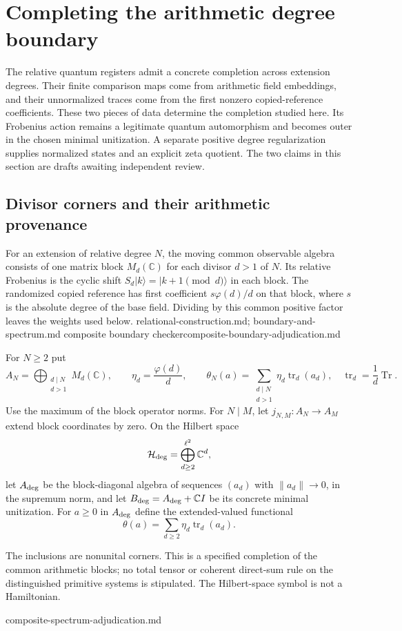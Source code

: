 \section{Completing the arithmetic degree boundary}
\label{sec:composite-degree-completion}

The relative quantum registers admit a concrete completion across extension
degrees. Their finite comparison maps come from arithmetic field embeddings,
and their unnormalized traces come from the first nonzero copied-reference
coefficients. These two pieces of data determine the completion studied
here. Its Frobenius action remains a legitimate quantum automorphism and
becomes outer in the chosen minimal unitization. A separate positive degree
regularization supplies normalized states and an explicit zeta quotient.
The two claims in this section are drafts awaiting independent review.

\subsection{Divisor corners and their arithmetic provenance}

For an extension of relative degree $N$, the moving common observable
algebra consists of one matrix block $M_d(\mathbb C)$ for each divisor
$d>1$ of $N$. Its relative Frobenius is the cyclic shift
$S_d|k\rangle=|k+1\pmod d\rangle$ in each block. The randomized copied
reference has first coefficient $s\varphi(d)/d$ on that block, where
$s$ is the absolute degree of the base field. Dividing by this common
positive factor leaves the weights used below.
{relational-construction.md; boundary-and-spectrum.md}
{composite boundary checker}{composite-boundary-adjudication.md}

\begin{definition}
For $N\geq2$ put
\[
 A_N=\bigoplus_{\substack{d\mid N\\d>1}}M_d(\mathbb C),\qquad
 \eta_d=\frac{\varphi(d)}d,\qquad
 \theta_N(a)=\sum_{\substack{d\mid N\\d>1}}\eta_d\operatorname{tr}_d(a_d),
 \quad \operatorname{tr}_d=\frac1d\operatorname{Tr}.
\]
Use the maximum of the block operator norms. For $N\mid M$, let
$j_{N,M}:A_N\to A_M$ extend block coordinates by zero.
On the Hilbert space
\[
 \mathcal H_{\rm deg}=\bigoplus_{d\geq2}^{\ell^2}\mathbb C^d,
\]
let $A_{\rm deg}$ be the block-diagonal algebra of sequences $(a_d)$ with
$\|a_d\|\to0$, in the supremum norm, and let
$B_{\rm deg}=A_{\rm deg}+\mathbb C I$ be its concrete minimal unitization.
For $a\geq0$ in $A_{\rm deg}$ define the extended-valued functional
\[
 \theta(a)=\sum_{d\geq2}\eta_d\operatorname{tr}_d(a_d).
\]
\end{definition}
\begin{scope}
The inclusions are nonunital corners. This is a specified completion of
the common arithmetic blocks; no total tensor or coherent direct-sum rule
on the distinguished primitive systems is stipulated. The Hilbert-space
symbol is not a Hamiltonian.
\end{scope}
{composite-spectrum-adjudication.md}

